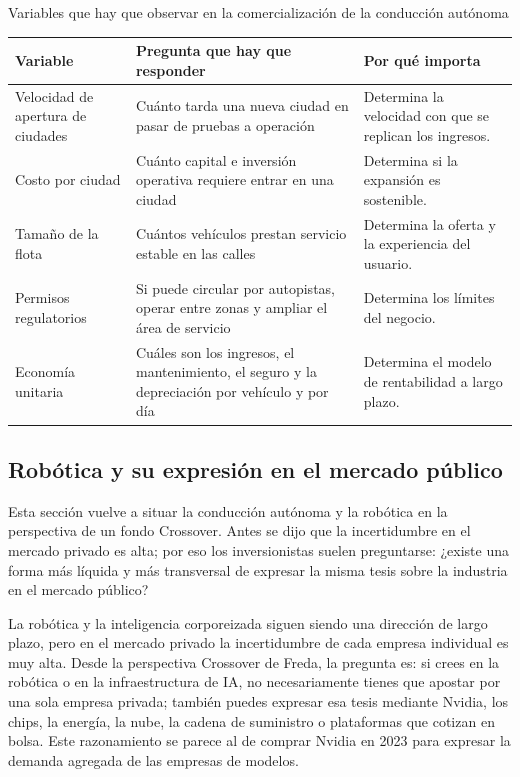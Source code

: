 \begin{knowledgebox}{Variables que hay que observar en la comercialización de la conducción autónoma}
\begin{tabularx}{\textwidth}{p{}p{}X}
\toprule
Variable & Pregunta que hay que responder & Por qué importa \\
\midrule
Velocidad de apertura de ciudades & Cuánto tarda una nueva ciudad en pasar de pruebas a operación & Determina la velocidad con que se replican los ingresos. \\
Costo por ciudad & Cuánto capital e inversión operativa requiere entrar en una ciudad & Determina si la expansión es sostenible. \\
Tamaño de la flota & Cuántos vehículos prestan servicio estable en las calles & Determina la oferta y la experiencia del usuario. \\
Permisos regulatorios & Si puede circular por autopistas, operar entre zonas y ampliar el área de servicio & Determina los límites del negocio. \\
Economía unitaria & Cuáles son los ingresos, el mantenimiento, el seguro y la depreciación por vehículo y por día & Determina el modelo de rentabilidad a largo plazo. \\
\bottomrule
\end{tabularx}
\end{knowledgebox}

\subsection{Robótica y su expresión en el mercado público}

Esta sección vuelve a situar la conducción autónoma y la robótica en la perspectiva de un fondo Crossover. Antes se dijo que la incertidumbre en el mercado privado es alta; por eso los inversionistas suelen preguntarse: ¿existe una forma más líquida y más transversal de expresar la misma tesis sobre la industria en el mercado público?

La robótica y la inteligencia corporeizada siguen siendo una dirección de largo plazo, pero en el mercado privado la incertidumbre de cada empresa individual es muy alta. Desde la perspectiva Crossover de Freda, la pregunta es: si crees en la robótica o en la infraestructura de IA, no necesariamente tienes que apostar por una sola empresa privada; también puedes expresar esa tesis mediante Nvidia, los chips, la energía, la nube, la cadena de suministro o plataformas que cotizan en bolsa. Este razonamiento se parece al de comprar Nvidia en 2023 para expresar la demanda agregada de las empresas de modelos.


